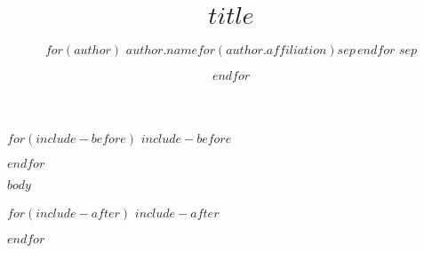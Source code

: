 \documentclass[final]{beamer}
\title{$title$}
\author{%
$for(author)$
  $author.name$$for(author.affiliation)$\inst{$author.affiliation$}$sep$\,$endfor$%
$sep$\and%
$endfor$
}
\institute{%
$for(affiliation)$
\inst{$affiliation.key$}
  $for(affiliation.name)$
    $affiliation.name$$sep$\\
  $endfor$
  $sep$\\[1ex]%
$endfor$
}
\begin{document}
$for(include-before)$
$include-before$

$endfor$
\begin{frame}[t,fragile]
$body$
\end{frame}
$for(include-after)$
$include-after$

$endfor$
\end{document}
